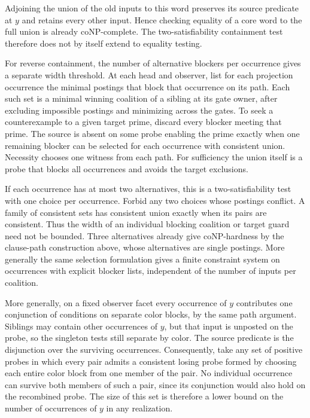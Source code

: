 Adjoining the union of the old inputs to this word preserves
its source predicate at $y$ and retains every other input.
Hence checking equality of a core word to the full union is
already coNP-complete. The two-satisfiability containment test
therefore does not by itself extend to equality testing.

For reverse containment, the number of alternative blockers
per occurrence gives a separate width threshold. At each head
and observer, list for each projection occurrence the minimal
postings that block that occurrence on its path. Each such
set is a minimal winning coalition of a sibling at its gate
owner, after excluding impossible postings and minimizing
across the gates. To seek a counterexample to a given target
prime, discard every blocker meeting that prime. The source
is absent on some probe enabling the prime exactly when one
remaining blocker can be selected for each occurrence with
consistent union. Necessity chooses one witness from each
path. For sufficiency the union itself is a probe that
blocks all occurrences and avoids the target exclusions.

If each occurrence has at most two alternatives, this is
a two-satisfiability test with one choice per occurrence.
Forbid any two choices whose postings conflict. A family of
consistent sets has consistent union exactly when its pairs
are consistent. Thus the width of an individual blocking
coalition or target guard need not be bounded. Three
alternatives already give coNP-hardness by the clause-path
construction above, whose alternatives are single postings.
More generally the same selection formulation gives a
finite constraint system on occurrences with explicit blocker
lists, independent of the number of inputs per coalition.

More generally, on a fixed observer facet every occurrence of
$y$ contributes one conjunction of conditions on separate
color blocks, by the same path argument. Siblings may contain
other occurrences of $y$, but that input is unposted on the
probe, so the singleton tests still separate by color. The
source predicate is the disjunction over the surviving
occurrences. Consequently, take any set of positive probes in
which every pair admits a consistent losing probe formed by
choosing each entire color block from one member of the pair.
No individual occurrence can survive both members of such a
pair, since its conjunction would also hold on the recombined
probe. The size of this set is therefore a lower bound on
the number of occurrences of $y$ in any realization.

